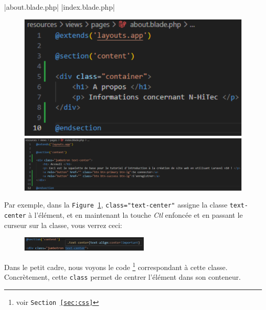 |about.blade.php|
|index.blade.php|
\begin{figure}[!ht]
    \centering
    \begin{minipage}{0.28\textwidth}
         \centering
         \includegraphics[width=\textwidth]{figures-C1/about_bs.pdf}
         \caption{\\\hspace{\textwidth} \protect{}}
    \end{minipage}
    \begin{minipage}{0.7\textwidth}
         \centering
         \includegraphics[width=\textwidth]{figures-C1/index_bs.pdf}
         \caption{\protect{}\label{fig:index_bs}}
    \end{minipage}
\end{figure}

Par exemple, dans la \texttt{Figure~\ref{fig:index_bs}}, \verb|class="text-center"| assigne la classe \verb|text-center| à l'élément, et en maintenant la touche \textit{Ctl} enfoncée et en passant le curseur sur la classe, vous verrez ceci:

\begin{figure}
    \vspace{-0.5cm}
    \includegraphics[width=0.55\textwidth]{figures-C1/see_class.pdf}
\end{figure}
Dans le petit cadre, nous voyons le code \css{}\footnote{voir \texttt{Section~\ref{sec:css}}} correspondant à cette classe. Concrètement, cette \verb|class| permet de centrer l'élément dans son conteneur.

